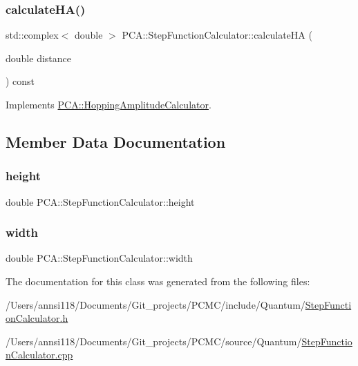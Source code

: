 \subsubsection{\texorpdfstring{calculate\+H\+A()}{calculateHA()}}
{\footnotesize\ttfamily std\+::complex$<$ double $>$ P\+C\+A\+::\+Step\+Function\+Calculator\+::calculate\+HA (\begin{DoxyParamCaption}\item[{double}]{distance }\end{DoxyParamCaption}) const\hspace{0.3cm}{\ttfamily [virtual]}}



Implements \hyperlink{class_p_c_a_1_1_hopping_amplitude_calculator_ae925735be8ef006f3f8dfdc1a23cae89}{P\+C\+A\+::\+Hopping\+Amplitude\+Calculator}.



\subsection{Member Data Documentation}
\hypertarget{class_p_c_a_1_1_step_function_calculator_a856f54997b5f0bfbe81040fa55f09146}{}\label{class_p_c_a_1_1_step_function_calculator_a856f54997b5f0bfbe81040fa55f09146} 
\subsubsection{\texorpdfstring{height}{height}}
{\footnotesize\ttfamily double P\+C\+A\+::\+Step\+Function\+Calculator\+::height\hspace{0.3cm}{\ttfamily [private]}}

\hypertarget{class_p_c_a_1_1_step_function_calculator_a777b92937ec96bdc1dc8f887affcb8b3}{}\label{class_p_c_a_1_1_step_function_calculator_a777b92937ec96bdc1dc8f887affcb8b3} 
\subsubsection{\texorpdfstring{width}{width}}
{\footnotesize\ttfamily double P\+C\+A\+::\+Step\+Function\+Calculator\+::width\hspace{0.3cm}{\ttfamily [private]}}



The documentation for this class was generated from the following files\+:\begin{DoxyCompactItemize}
\item 
/\+Users/annsi118/\+Documents/\+Git\+\_\+projects/\+P\+C\+M\+C/include/\+Quantum/\hyperlink{_step_function_calculator_8h}{Step\+Function\+Calculator.\+h}\item 
/\+Users/annsi118/\+Documents/\+Git\+\_\+projects/\+P\+C\+M\+C/source/\+Quantum/\hyperlink{_step_function_calculator_8cpp}{Step\+Function\+Calculator.\+cpp}\end{DoxyCompactItemize}
